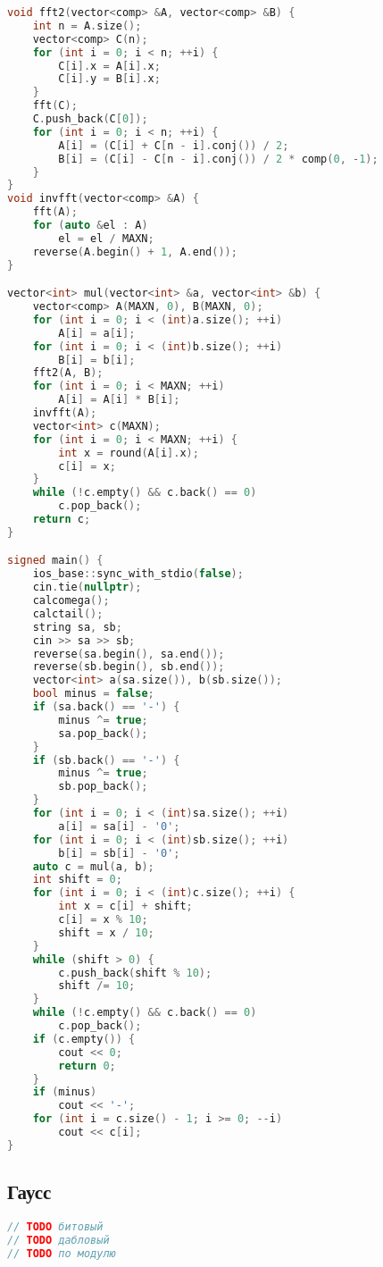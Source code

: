 \documentclass[10pt,a4paper,landscape,twosided]{extarticle}
\begin{document}
\begin{multicols}{3}
\begin{lstlisting}[language=C++]
void fft2(vector<comp> &A, vector<comp> &B) {
    int n = A.size();
    vector<comp> C(n);
    for (int i = 0; i < n; ++i) {
        C[i].x = A[i].x;
        C[i].y = B[i].x;
    }
    fft(C);
    C.push_back(C[0]);
    for (int i = 0; i < n; ++i) {
        A[i] = (C[i] + C[n - i].conj()) / 2;
        B[i] = (C[i] - C[n - i].conj()) / 2 * comp(0, -1);
    }
}
void invfft(vector<comp> &A) {
    fft(A);
    for (auto &el : A)
        el = el / MAXN;
    reverse(A.begin() + 1, A.end());
}

vector<int> mul(vector<int> &a, vector<int> &b) {
    vector<comp> A(MAXN, 0), B(MAXN, 0);
    for (int i = 0; i < (int)a.size(); ++i)
        A[i] = a[i];
    for (int i = 0; i < (int)b.size(); ++i)
        B[i] = b[i];
    fft2(A, B);
    for (int i = 0; i < MAXN; ++i)
        A[i] = A[i] * B[i];
    invfft(A);
    vector<int> c(MAXN);
    for (int i = 0; i < MAXN; ++i) {
        int x = round(A[i].x);
        c[i] = x;
    }
    while (!c.empty() && c.back() == 0)
        c.pop_back();
    return c;
}

signed main() {
    ios_base::sync_with_stdio(false);
    cin.tie(nullptr);
    calcomega();
    calctail();
    string sa, sb;
    cin >> sa >> sb;
    reverse(sa.begin(), sa.end());
    reverse(sb.begin(), sb.end());
    vector<int> a(sa.size()), b(sb.size());
    bool minus = false;
    if (sa.back() == '-') {
        minus ^= true;
        sa.pop_back();
    }
    if (sb.back() == '-') {
        minus ^= true;
        sb.pop_back();
    }
    for (int i = 0; i < (int)sa.size(); ++i)
        a[i] = sa[i] - '0';
    for (int i = 0; i < (int)sb.size(); ++i)
        b[i] = sb[i] - '0';
    auto c = mul(a, b);
    int shift = 0;
    for (int i = 0; i < (int)c.size(); ++i) {
        int x = c[i] + shift;
        c[i] = x % 10;
        shift = x / 10;
    }
    while (shift > 0) {
        c.push_back(shift % 10);
        shift /= 10;
    }
    while (!c.empty() && c.back() == 0)
        c.pop_back();
    if (c.empty()) {
        cout << 0;
        return 0;
    }
    if (minus)
        cout << '-';
    for (int i = c.size() - 1; i >= 0; --i)
        cout << c[i];
}

\end{lstlisting}

\subsection{Гаусс}
\begin{lstlisting}[language=C++]
// TODO битовый
// TODO дабловый
// TODO по модулю



\end{lstlisting}
\end{multicols}
\end{document}
